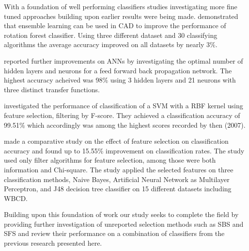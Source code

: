 With a foundation of well performing classifiers studies investigating more fine tuned approaches building upon earlier results were being made. \textcite{akin2011} demonstrated that ensemble learning can be used in CAD to improve the performance of rotation forest classifier. Using three different dataset and 30 classifying algorithms the average accuracy improved on all datasets by nearly 3\%.

\textcite{Abdel-Ilah2017} reported further improvements on ANNs by investigating the optimal number of hidden layers and neurons for a feed forward back propagation network. The highest accuracy acheived was 98\% using 3 hidden layers and 21 neurons with three distinct transfer functions.

\textcite{akay2009} investigated the performance of classification of a SVM with a RBF kernel using feature selection, filtering by F-score. They achieved a classification accuracy of 99.51\% which accordingly was among the highest scores recorded by then (2007).

\textcite{karabulut2012} made a comparative study on the effect of feature selection on classification accuracy and found up to 15.55\% improvement on classification rates. The study used only filter algorithms for feature selection, among those were both information and Chi-square. The study applied the selected features on three classification methods, Naive Bayes, Artificial Neural Network as Multilayer Perceptron, and J48 decision tree classifier on 15 different datasets including WBCD.

Building upon this foundation of work our study seeks to complete the field by providing further investigation of unreported selection methods such as SBS and SFS and review their performance on a combination of classifiers from the previous research presented here.
